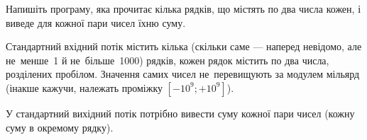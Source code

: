 ﻿Напишіть програму, яка прочитає кілька рядків, що містять по два числа кожен, і виведе для кожної пари чисел їхню суму.

\InputFile

Стандартний вхідний потік містить кілька (скільки саме --- наперед невідомо, але не~менше~1 й не~більше~1000) рядків, кожен рядок містить по два числа, розділених пробілом. Значення самих чисел не~перевищують за модулем мільярд (інакше кажучи, належать проміжку $[-10^9; +10^9]$).

\OutputFile

У стандартний вихідний потік потрібно вивести суму кожної пари чисел (кожну суму в окремому рядку).
